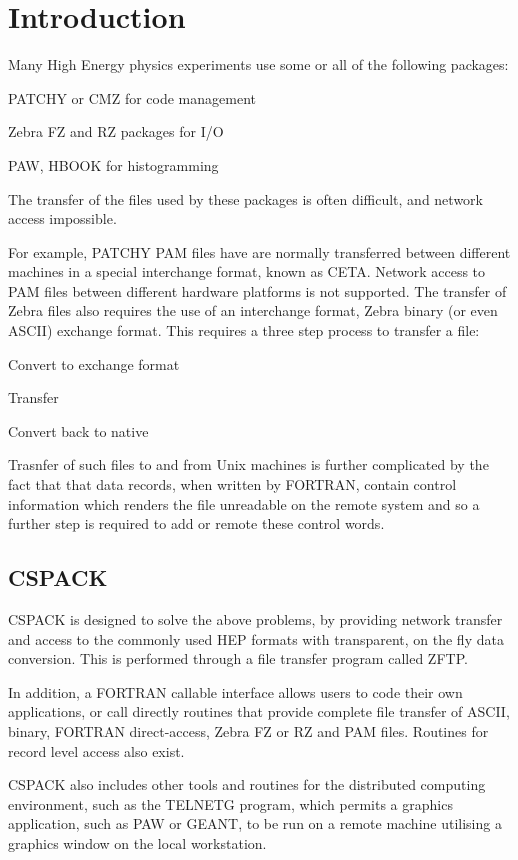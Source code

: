 \chapter{Introduction}
\par
Many High Energy physics experiments use some or all of the following
packages:
\begin{UL}
\item
PATCHY or CMZ for code management
\item
Zebra FZ and RZ packages for I/O
\item
PAW, HBOOK for histogramming
\end{UL}
The transfer of the files used by these packages
is often difficult, and network access impossible.
\par
For example, PATCHY PAM files have are normally transferred
between different machines in a special interchange format,
known as CETA. Network access to PAM files between different
hardware platforms is not supported.
The transfer of Zebra files also requires the use of an
interchange format, Zebra binary (or even ASCII) exchange
format. This requires a three step process to transfer a file:
\begin{UL}
\item
Convert to exchange format
\item
Transfer
\item
Convert back to native
\end{UL}
\par
Trasnfer of such files to and from Unix machines is further
complicated by the fact that that data records, when
written by FORTRAN, contain control information which
renders the file unreadable on the remote system and
so a further step is required to add or remote these
control words.
\section{CSPACK}
\par
CSPACK is designed to solve the above problems,
by providing network transfer and access to the
commonly used HEP formats with transparent, on the fly
data conversion. This is performed through a file
transfer program called ZFTP.
\par
In addition, a FORTRAN callable interface allows users
to code their own applications, or call directly
routines that provide complete file transfer
of ASCII, binary, FORTRAN direct-access, Zebra FZ or
RZ and PAM files. Routines for record level access also
exist.
\par
CSPACK also includes other tools and routines for
the distributed computing environment, such as the
TELNETG program, which permits a graphics application,
such as PAW or GEANT, to be run on a remote machine
utilising a graphics window on the local workstation.
